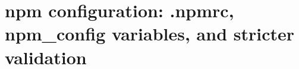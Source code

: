 \chapter{npm configuration: .npmrc, npm\_config variables, and stricter validation}
\label{ch:npm-configuration-npmrc-npm-config}

